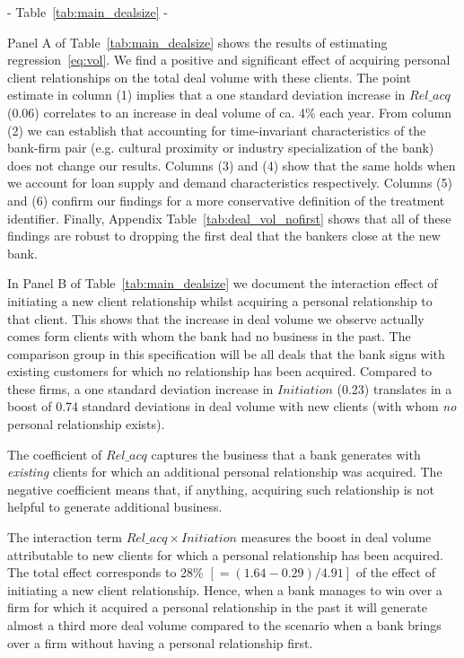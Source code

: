 \begin{center} - Table~\ref{tab:main_dealsize} - \end{center}

Panel A of Table~\ref{tab:main_dealsize} shows the results of estimating regression~\ref{eq:vol}. We find a positive and significant effect of acquiring personal client relationships on the total deal volume with these clients. The point estimate in column (1) implies that a one standard deviation increase in $Rel\_acq$ (0.06) correlates to an increase in deal volume of ca. 4\% each year. From column (2) we can establish that accounting for time-invariant characteristics of the bank-firm pair (e.g. cultural proximity or industry specialization of the bank) does not change our results. Columns (3) and (4) show that the same holds when we account for loan supply and demand characteristics respectively. Columns (5) and (6) confirm our findings for a more conservative definition of the treatment identifier. Finally, Appendix Table~\ref{tab:deal_vol_nofirst} shows that all of these findings are robust to dropping the first deal that the bankers close at the new bank. 

In Panel B of Table~\ref{tab:main_dealsize} we document the interaction effect of initiating a new client relationship whilst acquiring a personal relationship to that client. This shows that the increase in deal volume we observe actually comes form clients with whom the bank had no business in the past. The comparison group in this specification will be all deals that the bank signs with existing customers for which no relationship has been acquired. Compared to these firms, a one standard deviation increase in $Initiation$ (0.23) translates in a boost of 0.74 standard deviations in deal volume with new clients (with whom \emph{no} personal relationship exists).

The coefficient of $Rel\_acq$ captures the business that a bank generates with \emph{existing} clients for which an additional personal relationship was acquired. The negative coefficient means that, if anything, acquiring such relationship is not helpful to generate additional business. 

The interaction term $Rel\_acq \times Initiation$ measures the boost in deal volume attributable to new clients for which a personal relationship has been acquired. The total effect corresponds to 28\% $[=(1.64-0.29)/4.91]$ of the effect of initiating a new client relationship. Hence, when a bank manages to win over a firm for which it acquired a personal relationship in the past it will generate almost a third more deal volume compared to the scenario when a bank brings over a firm without having a personal relationship first.

